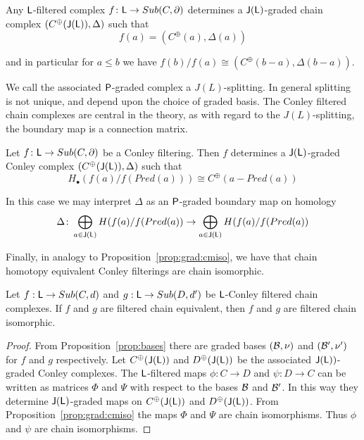 \begin{cor}
\label{prop:Lsplitting}
Any ${\mathsf L}$-filtered complex $f\colon {\mathsf L}\to Sub(C,\partial)$ determines a ${\mathsf J}({\mathsf L})$-graded chain complex $(C^\oplus({\mathsf J}({\mathsf L})),\Delta)$  such that $$f(a)= (C^\oplus(a),\Delta(a))$$

and in particular for $a\leq b$ we have $f(b)/f(a) \cong (C^\oplus(b-a),\Delta(b-a))$.

\end{cor}

We call the associated ${\mathsf P}$-graded complex a $J(L)$-splitting.  In general splitting is not unique, and depend upon the choice of graded basis.   The Conley filtered chain complexes are central in the theory, as with regard to the $J(L)$-splitting, the boundary map is a connection matrix.

\begin{cor}
Let $f\colon {\mathsf L} \to Sub(C,\partial)$  be a Conley filtering. Then $f$ determines a ${\mathsf J}({\mathsf L})$-graded Conley complex $(C^\oplus({\mathsf J}({\mathsf L})),\Delta)$ such that
\[
H_\bullet(f(a)/f(Pred(a))) \cong C^\oplus(a-Pred(a))
\]
\end{cor}

In this case we may interpret $\Delta$ as an ${\mathsf P}$-graded boundary map on homology
\[
\Delta \colon \bigoplus_{a\in {\mathsf J}({\mathsf L})} H(f(a)/f(Pred(a)) \to \bigoplus_{a\in {\mathsf J}({\mathsf L})} H(f(a)/f(Pred(a))
\]


Finally, in analogy to Proposition~\ref{prop:grad:cmiso}, we have that chain homotopy equivalent Conley filterings are chain isomorphic.

 \begin{prop}\label{prop:filt:cmiso}
 Let $f:{\mathsf L}\to Sub(C,d)$ and $g:{\mathsf L}\to Sub(D,d')$ be ${\mathsf L}$-Conley filtered chain complexes.  If $f$ and $g$ are filtered chain equivalent, then $f$ and $g$ are filtered chain isomorphic.
 
 \end{prop}
 \begin{proof}
From Proposition~\ref{prop:bases} there are graded bases $({\mathcal B},\nu)$ and $({\mathcal B}',\nu')$ for $f$ and $g$ respectively.  Let $C^\oplus({\mathsf J}({\mathsf L}))$ and $D^\oplus({\mathsf J}({\mathsf L}))$ be the associated ${\mathsf J}({\mathsf L}))$-graded Conley complexes.  The ${\mathsf L}$-filtered maps $\phi:C\to D$ and $\psi:D\to C$ can be written as matrices $\Phi$ and $\Psi$ with respect to the bases ${\mathcal B}$ and ${\mathcal B}'$.  In this way they determine ${\mathsf J}({\mathsf L})$-graded maps on $C^\oplus({\mathsf J}({\mathsf L}))$ and $D^\oplus({\mathsf J}({\mathsf L}))$.  From Proposition~\ref{prop:grad:cmiso} the maps $\Phi$ and $\Psi$ are chain isomorphisms.  Thus $\phi$ and $\psi$ are chain isomorphisms.
  \end{proof}



